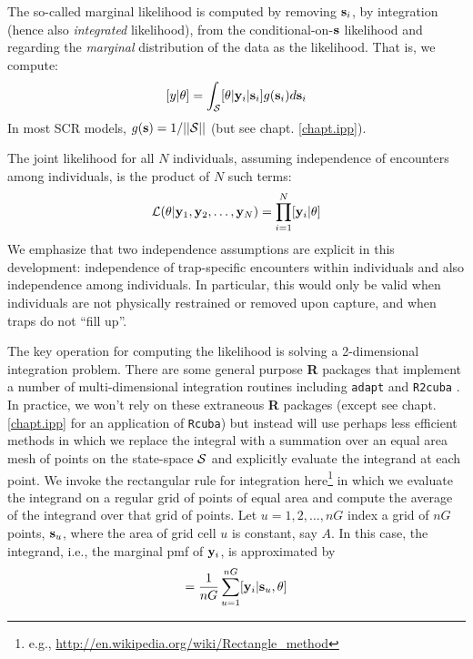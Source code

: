  The so-called marginal likelihood is computed by removing
${\bf s}_{i}$, by integration (hence also {\it integrated} likelihood), from the conditional-on-${\bf s}$
likelihood and regarding the {\it marginal} distribution of the data
as 
the likelihood. That
is, we compute:
\[
  [y|\theta] = 
\int_{{\cal S}}  [ \theta | {\bf y}_{i} |{\bf s}_{i}] g({\bf s}_{i}) d{\bf s}_{i}
\]
In most SCR models, $g({\bf s}) = 1/||{\cal S}||$ (but see chapt. \ref{chapt.ipp}).

The joint likelihood for all $N$ individuals, assuming independence of
encounters among individuals, is the product of $N$ such terms:
\[
{\cal L}(\theta | {\bf y}_{1},{\bf y}_{2},\ldots, {\bf y}_{N}) =     \prod_{i=1}^{N}
[{\bf y}_{i}|\theta]
\]
We emphasize that two independence assumptions are explicit in this
development: independence of trap-specific encounters within
individuals and also independence among individuals. In particular,
this would only be valid when individuals are not physically
restrained or removed upon capture, and when traps do not ``fill up''.

The key operation for computing the likelihood is solving a
2-dimensional integration problem. There are some general purpose {\bf
  R} packages that implement a number of 
 multi-dimensional integration routines
including \mbox{\tt adapt} \citep{genz_etal:2007} and \mbox{\tt R2cuba}
\citep{hahn_etal:2011}.  In practice, we won't rely
on these extraneous {\bf R} packages (except see
chapt. \ref{chapt.ipp} for an application of \mbox{\tt Rcuba})
but instead will use perhaps less
efficient methods in which we replace the integral with a summation
over an equal area mesh of points on the state-space ${\cal S}$ and explicitly
evaluate the integrand at each point. We invoke the rectangular rule
for integration here\footnote{e.g., 
\url{http://en.wikipedia.org/wiki/Rectangle_method}
} in which we
evaluate the
integrand on a regular grid of points of equal area and compute the
average of
the integrand over that grid of points. 
Let $u=1,2,\ldots,nG$ index a grid of
$nG$ points, ${\bf s}_{u}$,  where the area of grid cell $u$ is
constant, say $A$.
In this case, the integrand, i.e., the marginal pmf of 
${\bf y}_{i}$, is approximated by  
\begin{equation}
         [{\bf y}_{i}|\theta] = \frac{1}{nG} \sum_{u=1}^{nG}  [ {\bf
            y}_{i} |{\bf s}_u, \theta]
\label{mle.eq.intlik}
\end{equation}

